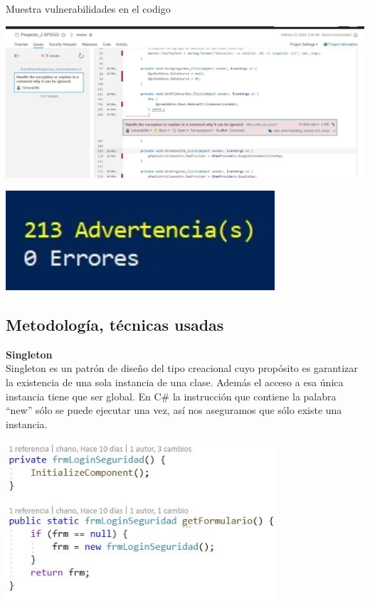 \documentclass[12pt,letterpaper]{article}
\begin{document}
Muestra vulnerabilidades en el codigo
\\
\begin{center}
	\includegraphics[width=15cm]{./img/image7.jpg} 
\end{center}
\begin{center}
	\includegraphics[width=10cm]{./img/image8.jpg} 
\end{center}

\subsection{Metodología, técnicas usadas}
\textbf{Singleton}
\\
Singleton es un patrón de diseño del tipo creacional cuyo propósito es garantizar la existencia de una sola instancia de una clase. Además el acceso a esa única instancia tiene que ser global.
En C\# la instrucción que contiene la palabra “new” sólo se puede ejecutar una vez, así nos aseguramos que sólo existe una instancia.
\\
\begin{center}
	\includegraphics[width=10cm]{./img/image9.jpg} 
\end{center}
\end{document}
